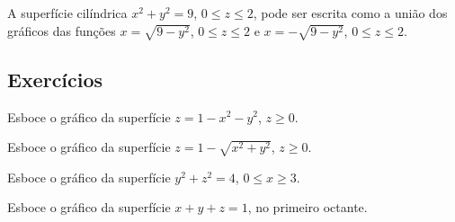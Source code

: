 \begin{ex}A superfície cilíndrica $x^2+y^2=9$, $0\leq z\leq 2$, pode ser escrita como a união dos gráficos das funções $x=\sqrt{9-y^2}$, $0\leq z\leq 2$ e $x=-\sqrt{9-y^2}$, $0\leq z\leq 2$.
\end{ex}

\subsection*{Exercícios}
\begin{exer}Esboce o gráfico da superfície $z=1-x^2-y^2$, $z\geq0$.
\end{exer}
\begin{exer}Esboce o gráfico da superfície $z=1-\sqrt{x^2+y^2}$, $z\geq0$.
\end{exer}
\begin{exer}Esboce o gráfico da superfície $y^2+z^2=4$, $0\leq x\geq 3$.
\end{exer}
\begin{exer}Esboce o gráfico da superfície $x+y+z=1$, no primeiro octante.
\end{exer}

